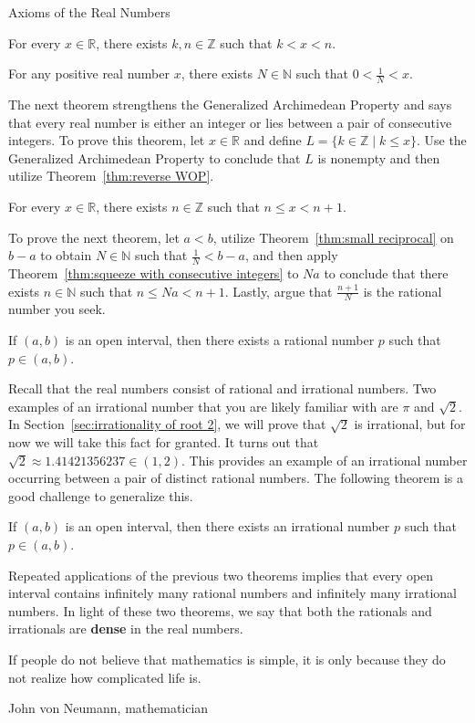 \begin{section}{Axioms of the Real Numbers}
\begin{theorem}
For every $x\in\mathbb{R}$, there exists $k,n\in\mathbb{Z}$ such that $k<x<n$.
\end{theorem}

\begin{theorem}\label{thm:small reciprocal}
For any positive real number $x$, there exists $N\in \mathbb{N}$ such that $0<\frac{1}{N}<x$.
\end{theorem}

The next theorem strengthens the Generalized Archimedean Property and says that every real number is either an integer or lies between a pair of consecutive integers. To prove this theorem, let $x\in\mathbb{R}$ and define $L=\{k\in\mathbb{Z}\mid k\leq x\}$. Use the Generalized Archimedean Property to conclude that $L$ is nonempty and then utilize Theorem~\ref{thm:reverse WOP}.

\begin{theorem}\label{thm:squeeze with consecutive integers}
For every $x\in\mathbb{R}$, there exists $n\in \mathbb{Z}$ such that $n\leq x<n+1$.
\end{theorem}

To prove the next theorem, let $a<b$, utilize Theorem~\ref{thm:small reciprocal} on $b-a$ to obtain $N\in\mathbb{N}$ such that $\frac{1}{N}<b-a$, and then apply Theorem~\ref{thm:squeeze with consecutive integers} to $Na$ to conclude that there exists $n\in\mathbb{N}$ such that $n\leq Na<n+1$. Lastly, argue that $\frac{n+1}{N}$ is the rational number you seek.

\begin{theorem}\label{thm:rationals dense}
If $(a,b)$ is an open interval, then there exists a rational number $p$ such that $p\in(a,b)$.
\end{theorem}

Recall that the real numbers consist of rational and irrational numbers.  Two examples of an irrational number that you are likely familiar with are $\pi$ and  $\sqrt{2}$. In Section~\ref{sec:irrationality of root 2}, we will prove that $\sqrt{2}$ is irrational, but for now we will take this fact for granted. It turns out that $\sqrt{2}\approx 1.41421356237\in (1,2)$. This provides an example of an irrational number occurring between a pair of distinct rational numbers. The following theorem is a good challenge to generalize this.

\begin{theorem}\label{thm:irrationals dense}
If $(a,b)$ is an open interval, then there exists an irrational number $p$ such that $p\in(a,b)$.
\end{theorem}

Repeated applications of the previous two theorems implies that every open interval contains infinitely many rational numbers and infinitely many irrational numbers. In light of these two theorems, we say that both the rationals and irrationals are \textbf{dense} in the real numbers. 

\epigraph{If people do not believe that mathematics is simple, it is only because they do not realize how complicated life is.}{John von Neumann, mathematician}
\end{section}